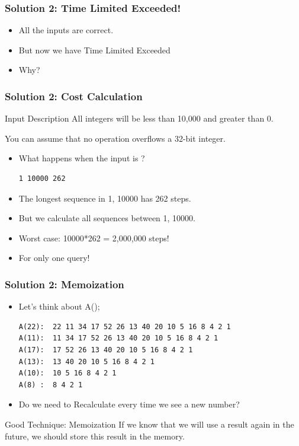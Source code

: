 \documentclass{beamer}
\begin{document}
\begin{frame}
  \frametitle{Solution 2: Time Limited Exceeded!}
  \begin{itemize}
    \item All the inputs are correct.
    \bigskip

    \item But now we have \alert{Time Limited Exceeded}
    \bigskip

    \item Why?
  \end{itemize}
\end{frame}

\begin{frame}[fragile]
  \frametitle{Solution 2: Cost Calculation}

    \begin{block}{Input Description}
    All integers will be \alert{less than 10,000 and greater than 0.}
    \bigskip

    You can \alert{assume that no operation overflows a 32-bit integer}.
    \end{block}
    \bigskip

    \begin{itemize}
      \item What happens when the input is ?
\begin{verbatim}
1 10000 262
\end{verbatim}
      \bigskip

      \item The longest sequence in 1, 10000 has 262 steps.
      \item But we calculate \alert{all} sequences between 1, 10000.
      \item Worst case: 10000*262 = 2,000,000 steps!
      \bigskip

      \item For only one query!
    \end{itemize}
\end{frame}

\begin{frame}[fragile]
  \frametitle{Solution 2: Memoization}

  \begin{itemize}
    \item Let's think about A();
\begin{verbatim}
A(22):  22 11 34 17 52 26 13 40 20 10 5 16 8 4 2 1
A(11):  11 34 17 52 26 13 40 20 10 5 16 8 4 2 1
A(17):  17 52 26 13 40 20 10 5 16 8 4 2 1
A(13):  13 40 20 10 5 16 8 4 2 1
A(10):  10 5 16 8 4 2 1
A(8) :  8 4 2 1
\end{verbatim}
    \bigskip

    \item Do we need to \alert{Recalculate} every time we see a new number?
  \end{itemize}

  \begin{block}{Good Technique: Memoization}
    If we know that we will use a result again in the future,
    we should \alert{store this result in the memory}.
  \end{block}
\end{frame}
\end{document}
